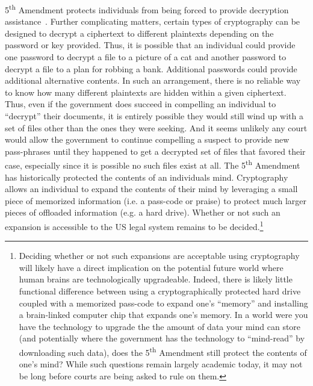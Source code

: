 \begin{packed_desc}
  5\textsuperscript{th} Amendment protects individuals from being
  forced to provide decryption assistance~\cite{usvboucher,
    commonwealthvgelfgatt, usvdoe}. Further complicating matters,
  certain types of cryptography can be designed to decrypt a
  ciphertext to different plaintexts depending on the password or key
  provided. Thus, it is possible that an individual could provide one
  password to decrypt a file to a picture of a cat and another
  password to decrypt a file to a plan for robbing a bank. Additional
  passwords could provide additional alternative contents. In such an
  arrangement, there is no reliable way to know how many different
  plaintexts are hidden within a given ciphertext. Thus, even if the
  government does succeed in compelling an individual to ``decrypt''
  their documents, it is entirely possible they would still wind up
  with a set of files other than the ones they were seeking. And it
  seems unlikely any court would allow the government to continue
  compelling a suspect to provide new pass-phrases until they happened
  to get a decrypted set of files that favored their case, especially
  since it is possible no such files exist at all. The
  5\textsuperscript{th} Amendment has historically protected the
  contents of an individuals mind. Cryptography allows an individual
  to expand the contents of their mind by leveraging a small piece of
  memorized information (i.e. a pass-code or praise) to protect much
  larger pieces of offloaded information (e.g. a hard drive). Whether
  or not such an expansion is accessible to the US legal system
  remains to be decided.\footnote{Deciding whether or not such
    expansions are acceptable using cryptography will likely have a
    direct implication on the potential future world where human
    brains are technologically upgradeable. Indeed, there is likely
    little functional difference between using a cryptographically
    protected hard drive coupled with a memorized pass-code to expand
    one's ``memory'' and installing a brain-linked computer chip that
    expands one's memory. In a world were you have the technology to
    upgrade the the amount of data your mind can store (and
    potentially where the government has the technology to
    ``mind-read'' by downloading such data), does the
    5\textsuperscript{th} Amendment still protect the contents of
    one's mind? While such questions remain largely academic today, it
    may not be long before courts are being asked to rule on them.}
\end{packed_desc}

